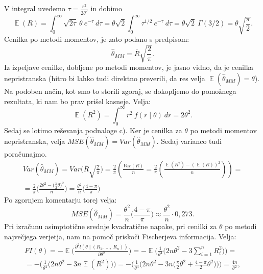 \documentclass{article}
\DeclareMathOperator{\EX}{\mathbb{E}}
\begin{document}
V integral uvedemo $\tau = \frac{r^{2}}{2 \theta^{2}}$ in dobimo
$$
\EX(R) = \int_{0}^{\infty}{\sqrt{2 \tau}~\theta ~e^{-\tau}~ d \tau} = \theta \sqrt{2}\int_{0}^{\infty}{\tau^{1/2}~e^{-\tau}~ d \tau} = \theta\sqrt{2}~\Gamma(3/2) = \theta \sqrt{\frac{\pi}{2}}.
$$
Cenilka po metodi momentov, je zato podano s predpisom:
$$
\hat{\theta}_{MM} = \overline{R} \sqrt{\frac{2}{\pi}}.
$$
Iz izpeljave cenilke, dobljene po metodi momentov, je jasno vidno, da je cenilka nepristranska (hitro bi lahko tudi direktno preverili, da res velja $\EX(\hat{\theta}_{MM}) = \theta$).
\newline
Na podoben način, kot smo to storili zgoraj, se dokopljemo do pomožnega rezultata, ki nam bo prav prišel kasneje. Velja:
$$
\EX(R^2) = \int_{0}^{\infty}{r^2~f(r \mid \theta)~dr}= 2 \theta^2.
$$
\newline
\newline
Sedaj se lotimo reševanja podnaloge c). Ker je cenilka za $\theta$ po metodi momentov nepristranska, velja $MSE(\hat{\theta}_{MM}) = Var(\hat{\theta}_{MM})$. Sedaj varianco tudi poračunajmo.
\begin{equation*}
    \begin{split}
    Var(\hat{\theta}_{MM}) = Var\bigg(\overline{R} \sqrt{\frac{2}{\pi}}\bigg) = \frac{2}{\pi} \left(\frac{Var(R)}{n} = \frac{2}{\pi}\left(\frac{\EX(R^2) - (\EX(R))^2}{n}\right)\right) = \\
    = \frac{2}{\pi}\bigg(\frac{2 \theta^2 - \big(\frac{\pi}{2} \theta\big)^2}{n}\bigg) = \frac{\theta^2}{n} \bigg(\frac{4 - \pi}{\pi}\bigg)
    \end{split}
\end{equation*}
Po zgornjem komentarju torej velja:
$$
MSE(\hat{\theta}_{MM}) = \frac{\theta^2}{n} \bigg(\frac{4 - \pi}{\pi}\bigg)\approx \frac{\theta^2}{n} \cdot 0{,}273.
$$
Pri izračunu asimptotične srednje kvadratične napake, pri cenilki za $\theta$ po metodi največjega verjetja, nam na pomoč priskoči Fischerjeva informacija. 
Velja:
\begin{equation*}
    \begin{split}
    FI(\theta) = - \EX\bigg(\frac{\partial^2 l(\theta \mid (R_1,~\dots,~R_n))}{\partial \theta^2}\bigg) = -\EX\bigg(\frac{1}{\theta^4}\bigg(2n\theta^2 - 3 \sum_{i=1}^{n}{R_i^2}\bigg)\bigg) = \\
    = -\bigg(\frac{1}{\theta^4}\bigg(2n \theta^2 - 3n \EX(R^2)\bigg)\bigg) = -\bigg(\frac{1}{\theta^4}\bigg(2n \theta^2 - 3n \Big(\frac{\pi}{2} \theta^2 + \frac{4- \pi}{2}\theta^2\Big)\bigg)\bigg) = \frac{4n}{\theta^2}, 
    \end{split}
\end{equation*}
\end{document}

